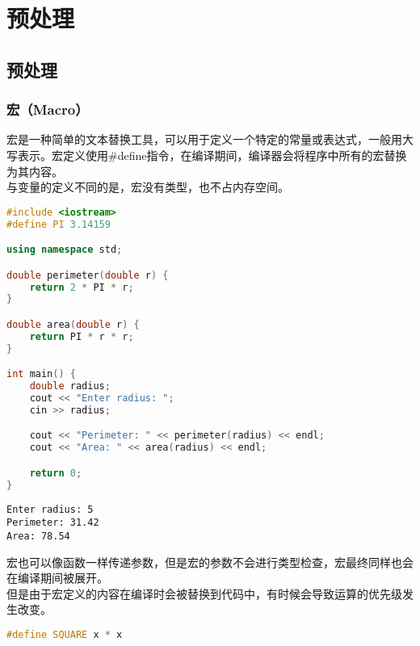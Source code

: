 \chapter{预处理}

\section{预处理}

\subsection{宏（Macro）}

宏是一种简单的文本替换工具，可以用于定义一个特定的常量或表达式，一般用大写表示。宏定义使用\#define指令，在编译期间，编译器会将程序中所有的宏替换为其内容。\\

与变量的定义不同的是，宏没有类型，也不占内存空间。\\


\begin{lstlisting}[language=C++]
#include <iostream>
#define PI 3.14159

using namespace std;

double perimeter(double r) {
    return 2 * PI * r;
}

double area(double r) {
    return PI * r * r;
}

int main() {
    double radius;
    cout << "Enter radius: ";
    cin >> radius;

    cout << "Perimeter: " << perimeter(radius) << endl;
    cout << "Area: " << area(radius) << endl;

    return 0;
}
\end{lstlisting}

\begin{tcolorbox}
    \begin{verbatim}
Enter radius: 5
Perimeter: 31.42
Area: 78.54
	\end{verbatim}
\end{tcolorbox}

宏也可以像函数一样传递参数，但是宏的参数不会进行类型检查，宏最终同样也会在编译期间被展开。\\

但是由于宏定义的内容在编译时会被替换到代码中，有时候会导致运算的优先级发生改变。

\vspace{-0.5cm}

\begin{lstlisting}[language=C++]
#define SQUARE x * x
\end{lstlisting}

